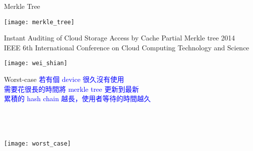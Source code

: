 \begin{frame}{Merkle Tree}
	\begin{center}
		\texttt{[image: merkle\_tree]}
	\end{center}
\end{frame}

\begin{frame}{\normalsize{Instant Auditing of Cloud Storage Access by Cache Partial Merkle tree}}
{\tiny{2014 IEEE 6th International Conference on Cloud Computing Technology and Science}}
	\begin{center}
		\texttt{[image: wei\_shian]}
	\end{center}
\end{frame}

\begin{frame}{Worst-case}
	\textcolor{blue}{若有個 device 很久沒有使用\\
    需要花很長的時間將 merkle tree 更新到最新\\
	累積的 hash chain 越長，使用者等待的時間越久}\\
	~\\
	~\\
	~\\
	\begin{center}
		\texttt{[image: worst\_case]}
	\end{center}
\end{frame}